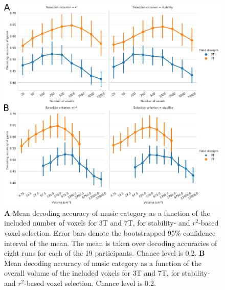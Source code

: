 \begin{figure}
  \centering
  \includegraphics[width=\linewidth]{pics/decoding_genre.pdf}

  \caption{\textbf{A} Mean decoding accuracy of music category as a function of
  the included number of voxels for 3T and 7T, for stability- and
  $r^2$-based voxel selection. Error bars denote the bootstrapped 95\%
  confidence interval of the mean. The mean is taken over decoding
  accuracies of eight runs for each of the 19 participants. Chance level is 0.2. \textbf{B} Mean
decoding accuracy of music category as a function of the overall volume of the
included voxels for 3T and 7T, for stability- and $r^2$-based voxel
selection. Chance level is 0.2.
}

 \label{fig:decoding_accuracy}
\end{figure}
